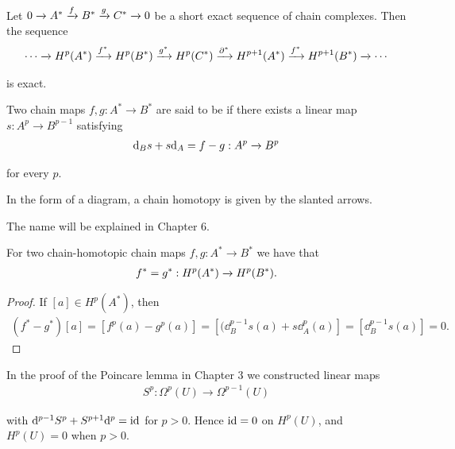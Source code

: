 \begin{theorem}\label{theorem:4-9}
Let $0\xrightarrow[]{}A^*\xrightarrow[]{f}B^*\xrightarrow[]{g}C^*\xrightarrow[]{}0$ be a short exact sequence of chain complexes. Then the sequence
\begin{align*}
  \cdots\xrightarrow[]{}H^p(A^*)\xrightarrow[]{f^*}H^p(B^*)\xrightarrow[]{g^*}H^p(C^*)\xrightarrow[]{\partial^*}H^{p+1}(A^*)\xrightarrow[]{f^*}H^{p+1}(B^*)\xrightarrow[]{} \cdots
\end{align*}

is exact.
\end{theorem}


\begin{definition}
  Two chain maps $f, g:A^*\to B^*$ are said to be  if there exists a linear map
$s:A^p\to B^{p-1}$ satisfying
\begin{align*}
  \mathrm{d}_{B}s + s\mathrm{d}_A = f - g: A^p\xrightarrow[]{}B^p
\end{align*}

for every $p$.
\end{definition}

In the form of a diagram, a chain homotopy is given by the slanted arrows.
\begin{center}
\end{center}


The name  will be explained in Chapter 6.


\begin{lemma}\label{lemma:4-11}
  For two chain-homotopic chain maps $f,g:A^*\to B^*$ we have that
  \begin{align*}
    f^* = g^*: H^p(A^*)\xrightarrow[]{}H^p(B^*).
  \end{align*}
\end{lemma}

\begin{proof}
  If $[a]\in H^p(A^*)$, then 
  \begin{align*}
    (f^* - g^*)[a] = [f^p(a) - g^p(a)] = [(\dd_B^{p-1}s(a) + s\dd^p_A(a)] 
    = [\dd^{p-1}_Bs(a)] 
    = 0.
  \end{align*}
\end{proof}


\begin{remark}\label{remark:4-12}
  In the proof of the Poincare lemma in Chapter 3 we constructed
linear maps
\begin{align*}
  S^p: \Omega^p(U)\to\Omega^{p-1}(U)
\end{align*}

with $\mathrm{d}^{p-1}S^p + S^{p+1}\mathrm{d}^p = \operatorname{id}$ for $p>0$. Hence $\operatorname{id}=0$ on $H^p(U)$, and $H^p(U) = 0$
when $p>0$.
\end{remark}

